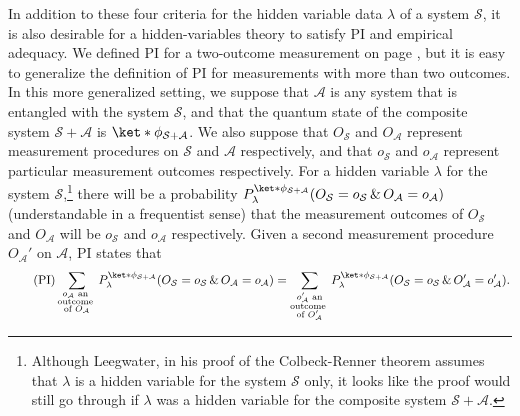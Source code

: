 \documentclass[12pt]{report}
\begin{document}
In addition to these four criteria for the hidden variable data $\lambda$ of a system $\mathcal{S}$, it is also desirable for a hidden-variables theory to satisfy PI and empirical adequacy. We defined PI for a two-outcome measurement on page \pageref{PIdef}, but it is easy to generalize the definition of PI for measurements with more than two outcomes. In this more generalized setting, we suppose that $\mathcal{A}$ is any system that is entangled with the system $\mathcal{S}$, and that the quantum state of the composite system $\mathcal{S}+\mathcal{A}$  is $\ket*{\phi}_{\mathcal{S}+\mathcal{A}}$. We also suppose that $O_{\mathcal{S}}$ and $O_{\mathcal{A}}$  %
%
 represent measurement procedures on $\mathcal{S}$ and $\mathcal{A}$ respectively, and that $o_{\mathcal{S}}$ and $o_{\mathcal{A}}$  %
 represent particular measurement outcomes respectively. For a hidden variable $\lambda$ for the system $\mathcal{S}$,\footnote{Although Leegwater, in his proof of the Colbeck-Renner theorem assumes that $\lambda$ is a hidden variable for the system $\mathcal{S}$ only, it looks like the proof would still go through if $\lambda$ was a hidden variable for the composite system $\mathcal{S}+\mathcal{A}$.} there will be a probability $P_\lambda^{\ket*{\phi}_{\mathcal{S}+\mathcal{A}}}(O_\mathcal{S}=o_\mathcal{S}\, \& \, O_\mathcal{A}=o_\mathcal{A})$ %
  (understandable in a frequentist sense) that the measurement outcomes of $O_{\mathcal{S}}$ and $O_{\mathcal{A}}$ will be $o_{\mathcal{S}}$  and $o_{\mathcal{A}}$ respectively. Given a second measurement procedure $O_{\mathcal{A}}'$ on $\mathcal{A}$, PI states that
\begin{equation}\tag{PI}
	\sum_{\substack{o_\mathcal{A}\text{ an }\\ \text{outcome }\\ 
	 \text{of }O_{\mathcal{A}}}}P_\lambda^{\ket*{\phi}_{\mathcal{S}+\mathcal{A}}}(O_\mathcal{S}=o_\mathcal{S}\, \& \,O_\mathcal{A}=o_\mathcal{A}) = \sum_{\substack{o_\mathcal{A}'\text{ an}\\ \text{outcome }\\ 
	 \text{of }O_{\mathcal{A}}'}}P_\lambda^{\ket*{\phi}_{\mathcal{S}+\mathcal{A}}}(O_\mathcal{S}=o_\mathcal{S}\, \& \,O'_\mathcal{A}=o'_\mathcal{A}). 
\end{equation}
\end{document}
